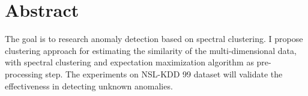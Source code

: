 \section{Abstract}
The goal is to research anomaly detection based on spectral clustering. I propose clustering approach for estimating the similarity of the multi-dimensional data, with spectral clustering and expectation maximization algorithm as pre-processing step. The experiments on NSL-KDD 99 dataset will validate the effectiveness in detecting unknown anomalies.
